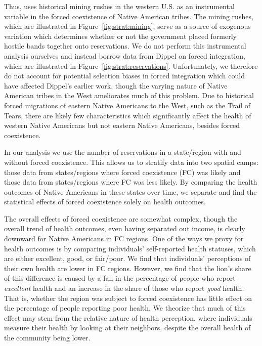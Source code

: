 \documentclass[12pt]{article}
\begin{document}
Thus, \cite{dippel2010forced} uses historical mining rushes in the western U.S. as an instrumental variable in the forced coexistence of Native American tribes.
The mining rushes, which are illustrated in Figure~\ref{fig:strat:mining}, serve as a source of exogenous variation which determines whether or not the government placed formerly hostile bands together onto reservations.
We do not perform this instrumental analysis ourselves and instead borrow data from Dippel on forced integration, which are illustrated in Figure~\ref{fig:strat:reservations}. 
Unfortunately, we therefore do not account for potential selection biases in forced integration which could have affected Dippel's earlier work, though the varying nature of Native American tribes in the West ameliorates much of this problem.
Due to historical forced migrations of eastern Native Americans to the West, such as the Trail of Tears, there are likely few characteristics which significantly affect the health of western Native Americans but not eastern Native Americans, besides forced coexistence.

In our analysis we use the number of reservations in a state/region with and without forced coexistence.
This allows us to stratify data into two spatial camps: those data from states/regions where forced coexistence (FC) was likely and those data from states/regions where FC was less likely.
By comparing the health outcomes of Native Americans in these states over time, we separate and find the statistical effects of forced coexistence solely on health outcomes.
    
The overall effects of forced coexistence are somewhat complex, though the overall trend of health outcomes, even having separated out income, is clearly downward for Native Americans in FC regions. 
One of the ways we proxy for health outcomes is by comparing individuals' self-reported health statuses, which are either excellent, good, or fair/poor.
We find that individuals' perceptions of their own health are lower in FC regions. 
However, we find that the lion's share of this difference is caused by a fall in the percentage of people who report \emph{excellent} health and an increase in the share of those who report \emph{good} health.
That is, whether the region was subject to forced coexistence has little effect on the percentage of people reporting poor health. 
We theorize that much of this effect may stem from the relative nature of health perception, where individuals measure their health by looking at their neighbors, despite the overall health of the community being lower.
\end{document}
